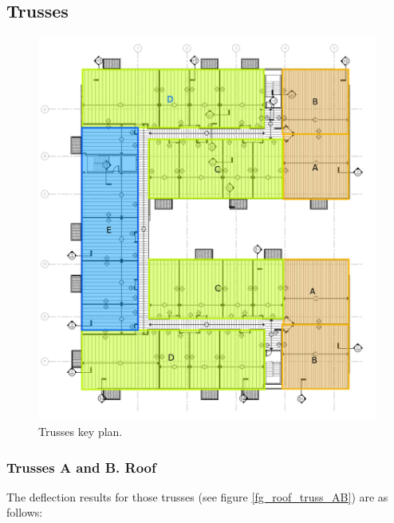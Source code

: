 \subsection{Trusses}

\begin{figure}
  \begin{center}
  \includegraphics[width=120mm]{figures/3rd_floor_truss_key_plan}
  \end{center}
  \caption{Trusses key plan.}\label{fg_3rd_floor_truss_key_plan}
\end{figure}

\subsubsection{Trusses A and B. Roof}
The deflection results for those trusses (see figure \ref{fg_roof_truss_AB}) are as follows:

